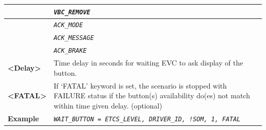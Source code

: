 \documentclass{template/openetcs}
\begin{document}
\begin{itemize}
\begin{longtable}{|l|l|}
				\hline
				
				&	\begin{minipage}[t]{0.78\linewidth} \emph{\texttt{VBC\_REMOVE}} \end{minipage} \\
				
				\hline
				
				&	\begin{minipage}[t]{0.78\linewidth} \emph{\texttt{ACK\_MODE}} \end{minipage} \\
				
				\hline
				
				&	\begin{minipage}[t]{0.78\linewidth} \emph{\texttt{ACK\_MESSAGE}} \end{minipage} \\
				
				\hline
				
				&	\begin{minipage}[t]{0.78\linewidth} \emph{\texttt{ACK\_BRAKE}} \end{minipage} \\
				
				\hline
								
								
					\begin{minipage}[t]{0.22\linewidth} \textbf{<Delay>} \end{minipage}
				&	\begin{minipage}[t]{0.78\linewidth} Time delay in seconds for waiting EVC to ask display of the button. \end{minipage} \\
				
				\hline
				
					\begin{minipage}[t]{0.22\linewidth} \textbf{<FATAL>} \end{minipage}
				&	\begin{minipage}[t]{0.78\linewidth} If ‘FATAL’ keyword is set, the scenario is stopped with FAILURE status if the button(s) availability do(es) not match within time given delay. (optional) \end{minipage} \\
				
				\hline
															
					\begin{minipage}[t]{0.22\linewidth} \textbf{Example} \end{minipage}
				&	\begin{minipage}[t]{0.78\linewidth} \emph{\texttt{WAIT\_BUTTON = ETCS\_LEVEL, DRIVER\_ID, !SOM, 1, FATAL}} \end{minipage} \\
				

\end{longtable}
\end{itemize}
\end{document}
